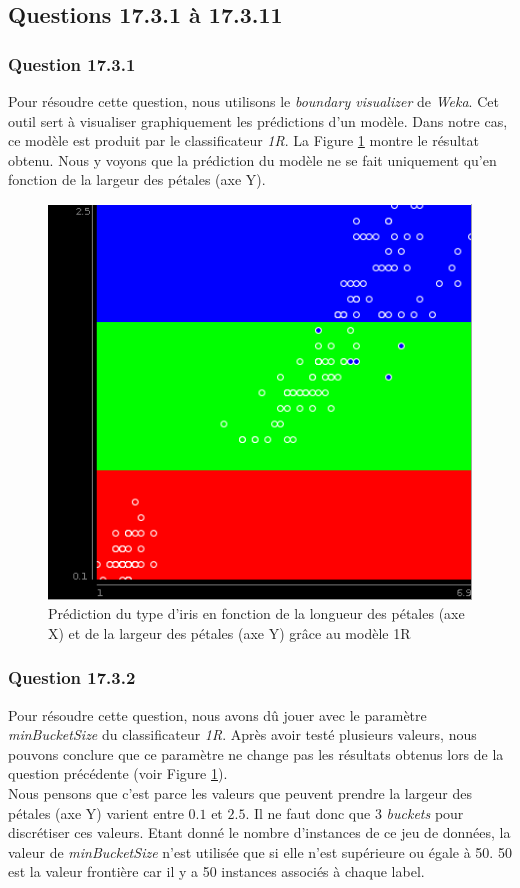 \documentclass[11pt,a4paper]{article}
\begin{document}
		\subsection{Questions 17.3.1 à 17.3.11}
		
			\subsubsection*{Question 17.3.1}
			
			Pour résoudre cette question, nous utilisons le \textit{boundary visualizer} de \textit{Weka}. Cet outil sert à visualiser graphiquement les prédictions d'un modèle. Dans notre cas, ce modèle est produit par le classificateur \textit{1R}. La Figure \ref{fig:iris:OneR} montre le résultat obtenu. Nous y voyons que la prédiction du modèle ne se fait uniquement qu'en fonction de la largeur des pétales (axe Y).
			
			\begin{figure}[h]
				\centering
				\includegraphics[width=.5\textwidth]{iris_OneR}
				\caption{Prédiction du type d'iris en fonction de la longueur des pétales (axe X) et de la largeur des pétales (axe Y) grâce au modèle 1R}
				\label{fig:iris:OneR}
			\end{figure}
			
			\subsubsection*{Question 17.3.2}
			
			Pour résoudre cette question, nous avons dû jouer avec le paramètre \textit{minBucketSize} du classificateur \textit{1R}. Après avoir testé plusieurs valeurs, nous pouvons conclure que ce paramètre ne change pas les résultats obtenus lors de la question précédente (voir Figure \ref{fig:iris:OneR}).\\
			
			Nous pensons que c'est parce les valeurs que peuvent prendre la largeur des pétales (axe Y) varient entre $0.1$ et $2.5$. Il ne faut donc que 3 \textit{buckets} pour discrétiser ces valeurs. Etant donné le nombre d'instances de ce jeu de données, la valeur de \textit{minBucketSize} n'est utilisée que si elle n'est supérieure ou égale à 50. 50 est la valeur frontière car il y a 50 instances associés à chaque label.
			
\end{document}
